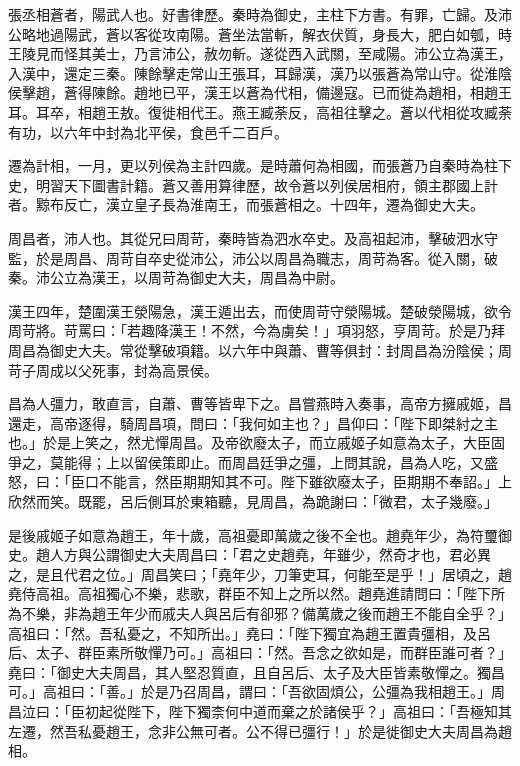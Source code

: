 
\begin{pinyinscope}
張丞相蒼者，陽武人也。好書律歷。秦時為御史，主柱下方書。有罪，亡歸。及沛公略地過陽武，蒼以客從攻南陽。蒼坐法當斬，解衣伏質，身長大，肥白如瓠，時王陵見而怪其美士，乃言沛公，赦勿斬。遂從西入武關，至咸陽。沛公立為漢王，入漢中，還定三秦。陳餘擊走常山王張耳，耳歸漢，漢乃以張蒼為常山守。從淮陰侯擊趙，蒼得陳餘。趙地已平，漢王以蒼為代相，備邊寇。已而徙為趙相，相趙王耳。耳卒，相趙王敖。復徙相代王。燕王臧荼反，高祖往擊之。蒼以代相從攻臧荼有功，以六年中封為北平侯，食邑千二百戶。

遷為計相，一月，更以列侯為主計四歲。是時蕭何為相國，而張蒼乃自秦時為柱下史，明習天下圖書計籍。蒼又善用算律歷，故令蒼以列侯居相府，領主郡國上計者。黥布反亡，漢立皇子長為淮南王，而張蒼相之。十四年，遷為御史大夫。

周昌者，沛人也。其從兄曰周苛，秦時皆為泗水卒史。及高祖起沛，擊破泗水守監，於是周昌、周苛自卒史從沛公，沛公以周昌為職志，周苛為客。從入關，破秦。沛公立為漢王，以周苛為御史大夫，周昌為中尉。

漢王四年，楚圍漢王滎陽急，漢王遁出去，而使周苛守滎陽城。楚破滎陽城，欲令周苛將。苛罵曰：「若趣降漢王！不然，今為虜矣！」項羽怒，亨周苛。於是乃拜周昌為御史大夫。常從擊破項籍。以六年中與蕭、曹等俱封：封周昌為汾陰侯；周苛子周成以父死事，封為高景侯。

昌為人彊力，敢直言，自蕭、曹等皆卑下之。昌嘗燕時入奏事，高帝方擁戚姬，昌還走，高帝逐得，騎周昌項，問曰：「我何如主也？」昌仰曰：「陛下即桀紂之主也。」於是上笑之，然尤憚周昌。及帝欲廢太子，而立戚姬子如意為太子，大臣固爭之，莫能得；上以留侯策即止。而周昌廷爭之彊，上問其說，昌為人吃，又盛怒，曰：「臣口不能言，然臣期期知其不可。陛下雖欲廢太子，臣期期不奉詔。」上欣然而笑。既罷，呂后側耳於東箱聽，見周昌，為跪謝曰：「微君，太子幾廢。」

是後戚姬子如意為趙王，年十歲，高祖憂即萬歲之後不全也。趙堯年少，為符璽御史。趙人方與公謂御史大夫周昌曰：「君之史趙堯，年雖少，然奇才也，君必異之，是且代君之位。」周昌笑曰；「堯年少，刀筆吏耳，何能至是乎！」居頃之，趙堯侍高祖。高祖獨心不樂，悲歌，群臣不知上之所以然。趙堯進請問曰：「陛下所為不樂，非為趙王年少而戚夫人與呂后有卻邪？備萬歲之後而趙王不能自全乎？」高祖曰：「然。吾私憂之，不知所出。」堯曰：「陛下獨宜為趙王置貴彊相，及呂后、太子、群臣素所敬憚乃可。」高祖曰：「然。吾念之欲如是，而群臣誰可者？」堯曰：「御史大夫周昌，其人堅忍質直，且自呂后、太子及大臣皆素敬憚之。獨昌可。」高祖曰：「善。」於是乃召周昌，謂曰：「吾欲固煩公，公彊為我相趙王。」周昌泣曰：「臣初起從陛下，陛下獨柰何中道而棄之於諸侯乎？」高祖曰：「吾極知其左遷，然吾私憂趙王，念非公無可者。公不得已彊行！」於是徙御史大夫周昌為趙相。


\end{pinyinscope}
